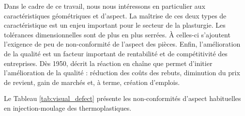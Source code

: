 
Dans le cadre de ce travail, nous nous intéressons en particulier aux caractéristiques géométriques et d'aspect.
La maîtrise de ces deux types de caractéristique est un enjeu important pour le secteur de la plasturgie.
Les tolérances dimensionnelles sont de plus en plus serrées.
À celles-ci s'ajoutent l'exigence de peu de non-conformité de l'aspect des pièces.
Enfin, l'amélioration de la qualité est un facteur important de rentabilité et de compétitivité des entreprises.
Dès 1950, \citeauthor{deming_quality_1982} \cite{deming_quality_1982} décrit la réaction en chaîne que permet d'initier l'amélioration de la qualité : réduction des coûts des rebuts, diminution du prix de revient, gain de marchés et, à terme, création d'emplois.

Le Tableau \ref{tab:visual_defect} présente les non-conformités d'aspect habituelles en injection-moulage des thermoplastiques.


